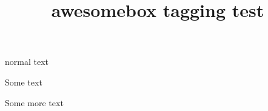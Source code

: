 \documentclass{article}
\title{awesomebox tagging test}
\begin{document}
normal text
\begin{noteblock}
Some text
\end{noteblock}
\begin{tipblock}
Some more text
\end{tipblock}
\end{document}
